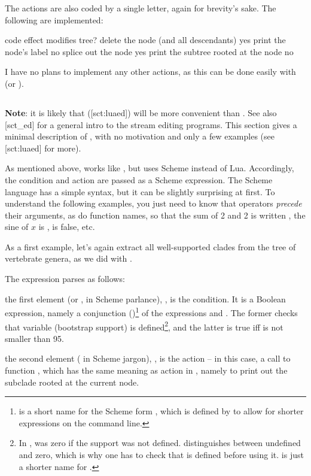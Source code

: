 The actions are also coded by a single letter, again for brevity's sake. The
following are implemented:

\startalignment[center]
	\starttabulate[|c|l|c|]
		\NC code \NC effect \NC modifies tree?\NC\NR
		\HL
		\NC {} \NC delete the node (and all descendants) \NC yes \NC\NR
		\NC {} \NC print the node's label \NC no \NC\NR
		\NC {} \NC splice out the node \NC yes \NC\NR
		\NC {} \NC print the subtree rooted at the node \NC no \NC\NR
	\stoptabulate
\stopalignment

I have no plans to implement any other actions, as this can be done easily
with \luaed{} (or \sched).




\subsection{\sched}

{\bf Note}: it is likely that \luaed{} (\in{}[sct:luaed]) will be more
convenient than \sched. See also [sct_ed] for a general intro to the
stream editing programs. This section gives a minimal description of \sched,
with no motivation and only a few examples (see \in{}[sct:luaed] for more).

As mentioned above, \sched{} works like \luaed{}, but uses Scheme
instead of Lua. Accordingly, the condition and action are passed as a Scheme
expression. The Scheme language has a simple syntax, but it can
be slightly surprising at first. To understand the following examples, you just
need to know that operators {\em precede} their arguments, as do function
names, so that the sum of 2 and 2 is written , the sine of $x$
is ,  is false, etc.

As a first example, let's again extract all well-supported clades from the tree
of vertebrate genera, as we did with \luaed.


The expression  parses as follows:
\startitemize
	\item the first element (or , in Scheme parlance), , is the condition.  It is a Boolean expression, namely a
	conjunction (\code{\&})\footnote{\code{\&} is a short name for the Scheme form
	, which is defined by \sched{} to allow for shorter expressions on
	the command line.} of the expressions  and .
	The former checks that variable  (bootstrap support) is
	defined\footnote{In \ed,  was zero if the support was not defined.
	\sched{} distinguishes between undefined and zero, which is why one has to
	check that  is defined before using it.   is just a shorter
	name for .}, and the latter is true iff  is not smaller
	than 95.
	\item the second element ( in Scheme jargon), , is the
	action -- in this case, a call to function , which has the same
	meaning as action  in \ed, namely to print out the subclade rooted at
	the current node.
\stopitemize


